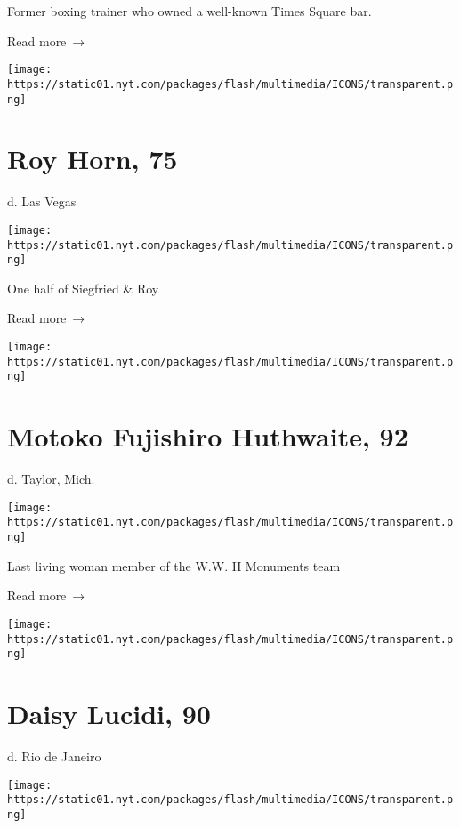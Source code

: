 Former boxing trainer who owned a well-known Times Square bar.

 Read more~→

\href{https://www.nytimes.com/2020/05/08/obituaries/roy-horn-dead-covid.html}{}

\texttt{[image: https://static01.nyt.com/packages/flash/multimedia/ICONS/transparent.png]}

\hypertarget{roy-horn-75}{%
\section{Roy Horn, 75}\label{roy-horn-75}}

d. Las Vegas

\texttt{[image: https://static01.nyt.com/packages/flash/multimedia/ICONS/transparent.png]}

One half of Siegfried \& Roy

 Read more~→

\href{https://www.nytimes.com/2020/05/08/us/motoko-fujishiro-huthwaite-dead-coronavirus.html}{}

\texttt{[image: https://static01.nyt.com/packages/flash/multimedia/ICONS/transparent.png]}

\hypertarget{motoko-fujishiro-huthwaite-92}{%
\section{Motoko Fujishiro Huthwaite,
92}\label{motoko-fujishiro-huthwaite-92}}

d. Taylor, Mich.

\texttt{[image: https://static01.nyt.com/packages/flash/multimedia/ICONS/transparent.png]}

Last living woman member of the W.W. II Monuments team

 Read more~→

\href{https://www.nytimes.com/2020/05/08/obituaries/daisy-lucidi-dead-coronavirus.html}{}

\texttt{[image: https://static01.nyt.com/packages/flash/multimedia/ICONS/transparent.png]}

\hypertarget{daisy-lucidi-90}{%
\section{Daisy Lucidi, 90}\label{daisy-lucidi-90}}

d. Rio de Janeiro

\texttt{[image: https://static01.nyt.com/packages/flash/multimedia/ICONS/transparent.png]}

